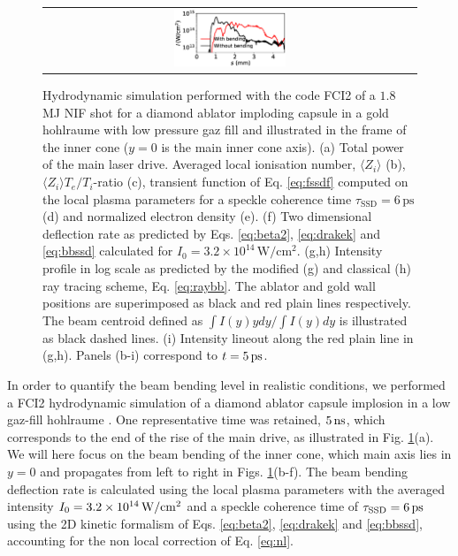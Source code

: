 \documentclass[%
 reprint,
 amsmath,amssymb,
 aps,
]{revtex4-1}
\begin{document}
\begin{figure}
\begin{tabular}{ccc}
&\includegraphics[width=0.33\textwidth]{raybb_FCI2_lineout.eps}
\end{tabular}
\caption{ \label{fig:icf} 
Hydrodynamic simulation performed with the code FCI2 of a $1.8$ MJ NIF shot for a diamond ablator imploding capsule in a gold hohlraume with low pressure gaz fill and illustrated in the frame of the inner cone ($y=0$ is the main inner cone axis). 
(a) Total power of the main laser drive.
 Averaged local ionisation number, $\langle Z_i\rangle$ (b), $\langle Z_i\rangle T_e/T_i$-ratio (c),
transient function of Eq. \eqref{eq:fssdf} computed on the local plasma parameters for a speckle coherence time $\tau_\mathrm{SSD}=6\,\mathrm{ps}$ (d) and normalized electron density (e).
(f) Two dimensional  deflection rate as predicted by Eqs. \eqref{eq:beta2}, \eqref{eq:drakek} and \eqref{eq:bbssd} calculated for    $I_0=3.2\times 10^{14}\,\mathrm{W/cm^2}$.
(g,h) Intensity profile in log scale as predicted by the modified  (g) and classical (h) ray tracing scheme, Eq. \eqref{eq:raybb}. The ablator and gold wall positions are superimposed as black and red plain lines respectively.   The beam centroid defined as $\int I(y)y dy/\int I(y) dy$ is illustrated as black dashed lines. 
(i) Intensity lineout along the red plain line in (g,h).
Panels (b-i) correspond to  $t=5\,\rm ps$.
}
\end{figure}
In order to quantify the beam bending level in realistic conditions, we performed a FCI2 hydrodynamic simulation of a diamond  ablator capsule implosion in a  low gaz-fill hohlraume \cite[]{Lefebvre_2018}.
One  representative  time was retained,  $5\,\rm ns$, which corresponds  to  the end of the rise of the main drive, as illustrated in Fig. \ref{fig:icf}(a).
We will here focus on the beam bending of the inner cone, which main axis lies in $y=0$ and propagates  from left to right in  Figs. \ref{fig:icf}(b-f). 
The beam bending deflection rate is   calculated using the local plasma parameters with the averaged intensity $I_0=3.2\times 10^{14}\,\rm W/cm^2$ and a speckle coherence time of $\tau_\mathrm{SSD}=6\,\rm ps$ using the 2D kinetic formalism  of Eqs.  \eqref{eq:beta2}, \eqref{eq:drakek} and  \eqref{eq:bbssd}, accounting for the non local correction of Eq. \eqref{eq:nl}.
\end{document}
